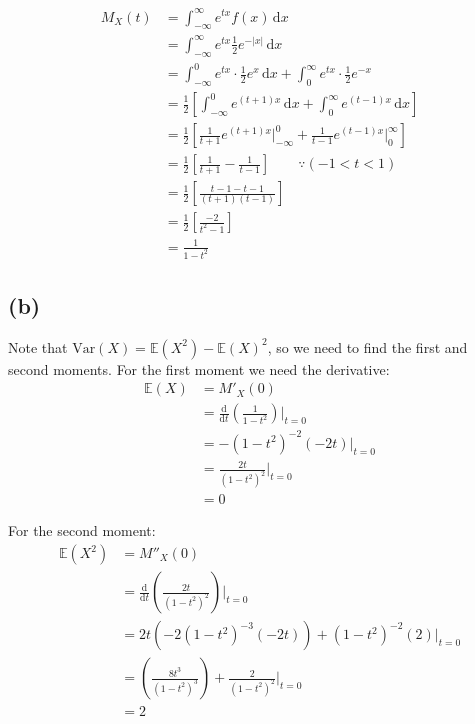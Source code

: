 \documentclass[12pt]{article}
\begin{document}
\begin{align*}
    M_X (t) &= \int_{-\infty}^{\infty} e^{tx}f(x) \, \mathrm{d}x \\ 
    &= \int_{-\infty}^{\infty} e^{tx}\frac{1}{2}e^{-|x|} \, \mathrm{d}x \\ 
    &= \int_{-\infty}^{0} e^{tx} \cdot \frac{1}{2} e^{x} \, \mathrm{d}x + \int_{0}^{\infty} e^{tx} \cdot \frac{1}{2} e^{-x} \\
    &= \frac{1}{2}\left[ \int_{-\infty}^{0} e^{(t+1)x} \, \mathrm{d} x+ \int_{0}^{\infty} e^{(t-1)x} \, \mathrm{d} x\right] \\ 
    &= \frac{1}{2} \left[ \frac{1}{t+1} e^{(t+1)x} \Biggr|_{-\infty}^{0} + \frac{1}{t-1} e^{(t-1)x} \Biggr|_{0}^{\infty}\right] \\ 
    &= \frac{1}{2}\left[\frac{1}{t+1} - \frac{1}{t-1}\right] \qquad \because (-1 < t < 1) \\
    &= \frac{1}{2} \left[ \frac{t-1-t-1}{(t+1)(t-1)}\right] \\ 
    &= \frac{1}{2} \left[ \frac{-2}{t^{2} - 1}\right] \\ 
    &= \boxed{\frac{1}{1-t^{2}}}
\end{align*}

\subsection*{(b)}

Note that $\text{Var}(X) = \mathbb{E}(X^{2}) - \mathbb{E}(X)^{2}$, so we need to find the first and second moments. For the first moment we need the derivative: \begin{align*}
    \mathbb{E}(X) &= M'_X (0) \\ 
    &= \frac{\text{d}}{\text{d}t}\left( \frac{1}{1 - t^{2}}\right) \Biggr|_{t=0} \\ 
    &= -(1-t^{2})^{-2}(-2t) \Bigr|_{t=0} \\ 
    &= \frac{2t}{(1-t^{2})^{2}} \Biggr|_{t=0} \\ 
    &= 0
\end{align*}

\noindent For the second moment: \begin{align*}
    \mathbb{E}(X^{2}) &= M''_X (0) \\ 
    &= \frac{\text{d}}{\text{d}t}\left(\frac{2t}{(1-t^{2})^{2}}\right) \Biggr|_{t=0} \\ 
    &= 2t(-2(1-t^{2})^{-3} (-2t)) + (1-t^{2})^{-2}(2) \Bigr|_{t=0} \\ 
    &= \left(\frac{8t^{3}}{(1-t^{2})^{3}}\right) + \frac{2}{(1-t^{2})^{2}} \Biggr|_{t=0} \\ 
    &= 2
\end{align*}
\end{document}
